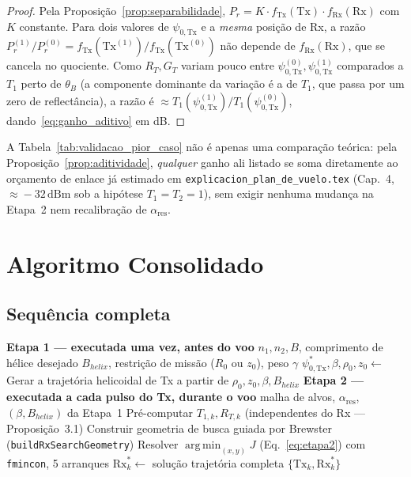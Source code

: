 \documentclass[12pt,a4paper,oneside]{book}
\newcommand{\nota}[2]{%
  \begin{tcolorbox}[enhanced, breakable,
    colback=green!5, colframe=green!50!black,
    fonttitle=\bfseries\small,
    title={\protect#1}]
    #2
  \end{tcolorbox}}
\theoremstyle{definition}
\theoremstyle{remark}
\newcommand{\RT}{R_T}
\newcommand{\thetaB}{\theta_B}
\newcommand{\Prcv}{P_r}
\newcommand{\psiT}{\psi_{0,\mathrm{Tx}}}
\begin{document}
\begin{proof}
Pela Proposição~\ref{prop:separabilidade}, $\Prcv=K\cdot f_{\mathrm{Tx}}(\mathrm{Tx})\cdot f_{\mathrm{Rx}}(\mathrm{Rx})$
com $K$ constante. Para dois valores de $\psiT$ e a \emph{mesma} posição
de Rx, a razão $\Prcv^{(1)}/\Prcv^{(0)} = f_{\mathrm{Tx}}(\mathrm{Tx}^{(1)})/f_{\mathrm{Tx}}(\mathrm{Tx}^{(0)})$
não depende de $f_{\mathrm{Rx}}(\mathrm{Rx})$, que se cancela no
quociente. Como $\RT,G_T$ variam pouco entre $\psiT^{(0)},\psiT^{(1)}$
comparados a $T_1$ perto de $\thetaB$ (a componente dominante da variação
é a de $T_1$, que passa por um zero de reflectância), a razão é
$\approx T_1(\psiT^{(1)})/T_1(\psiT^{(0)})$, dando~\eqref{eq:ganho_aditivo}
em dB.
\end{proof}

\nota{Consequência prática}{
A Tabela~\ref{tab:validacao_pior_caso} não é apenas uma comparação
teórica: pela Proposição~\ref{prop:aditividade}, \emph{qualquer} ganho
ali listado se soma diretamente ao orçamento de enlace já estimado em
\texttt{explicacion\_plan\_de\_vuelo.tex} (Cap.~4, $\approx\!-32\,\mathrm{dBm}$
sob a hipótese $T_1=T_2=1$), sem exigir nenhuma mudança na Etapa~2 nem
recalibração de $\alpha_{\mathrm{res}}$.
}

\chapter{Algoritmo Consolidado}
\label{cap:algoritmo}

\section{Sequência completa}

\begin{algorithm}[H]
\caption{Estratégia sequencial Tx$\to$Rx completa}
\begin{algorithmic}[1]
\Statex \textbf{Etapa 1 --- executada uma vez, antes do voo}
\Require $n_1,n_2,B$, comprimento de hélice desejado $B_{helix}$,
  restrição de missão ($R_0$ ou $z_0$), peso $\gamma$
\State $\psiT^*,\beta,\rho_0,z_0 \gets$  
\State Gerar a trajetória helicoidal de Tx a partir de $\rho_0,z_0,\beta,B_{helix}$
\Statex
\Statex \textbf{Etapa 2 --- executada a cada pulso do Tx, durante o voo}
\Require malha de alvos, $\alpha_{\mathrm{res}}$, $(\beta,B_{helix})$ da Etapa~1
  \State Pré-computar $T_{1,k},R_{T,k}$ (independentes do Rx --- Proposição~3.1)
  \State Construir geometria de busca guiada por Brewster (\texttt{buildRxSearchGeometry})
  \State Resolver $\operatorname*{arg\,min}_{(x,y)} J$ (Eq.~\eqref{eq:etapa2}) com \texttt{fmincon}, 5 arranques
  \State $\mathrm{Rx}_k^* \gets$ solução
\EndFor
\State \Return trajetória completa $\{\mathrm{Tx}_k,\mathrm{Rx}_k^*\}$
\end{algorithmic}
\end{algorithm}
\end{document}
